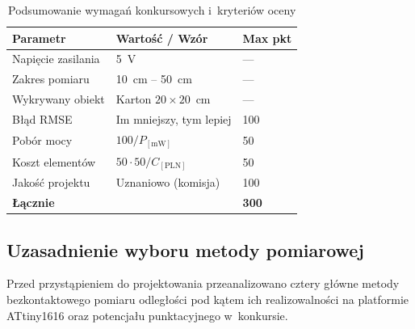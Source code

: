 \documentclass[a4paper,11pt]{article}
\begin{document}
\begin{table}[H]
    \centering
    \caption{Podsumowanie wymagań konkursowych i~kryteriów oceny}
    \label{tab:wymagania}
    \begin{tabular}{lll}
        \toprule
        \textbf{Parametr}       & \textbf{Wartość / Wzór} & \textbf{Max pkt} \\
        \midrule
        Napięcie zasilania      & \SI{5}{\volt}  & --- \\
        Zakres pomiaru          & \SI{10}{\centi\metre} -- \SI{50}{\centi\metre} & --- \\
        Wykrywany obiekt        & Karton $20 \times 20$~\si{\centi\metre} & --- \\
        Błąd RMSE               & Im mniejszy, tym lepiej & 100 \\
        Pobór mocy              & $100 / P_{[\si{\milli\watt}]}$ & 50 \\
        Koszt elementów         & $50 \cdot 50 / C_{[\text{PLN}]}$ & 50 \\
        Jakość projektu         & Uznaniowo (komisja) & 100 \\
        \midrule
        \textbf{Łącznie}        & & \textbf{300} \\
        \bottomrule
    \end{tabular}
\end{table}

\subsection{Uzasadnienie wyboru metody pomiarowej}

Przed przystąpieniem do projektowania przeanalizowano cztery główne metody
bezkontaktowego pomiaru odległości pod kątem ich realizowalności na platformie
ATtiny1616 oraz potencjału punktacyjnego w~konkursie.
\end{document}
